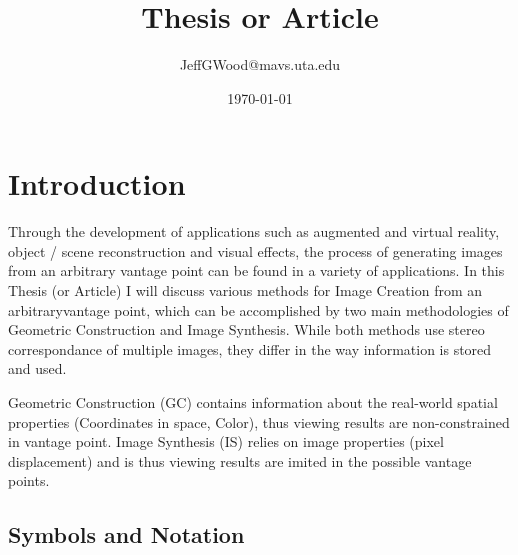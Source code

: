 \documentclass{report}
\title{Thesis or Article}
\author{JeffGWood@mavs.uta.edu}
\date{\today}
\begin{document}
\Huge
\maketitle
\large
\newpage
\tableofcontents
\newpage


\chapter{Introduction}
\par Through the development of applications such as augmented and virtual reality, object / scene reconstruction and visual effects, the process of generating images from an arbitrary vantage point can be found in a variety of applications. In this Thesis (or Article) I will discuss various methods for Image Creation from an arbitraryvantage point, which can be accomplished by two main methodologies of Geometric Construction and Image Synthesis. While both methods use stereo correspondance of multiple images, they differ in the way information is stored and used.
\par Geometric Construction (GC) contains information about the real-world spatial properties (Coordinates in space, Color), thus viewing results are non-constrained in vantage point. Image Synthesis (IS) relies on image properties (pixel displacement) and is thus viewing results are imited in the possible vantage points.
\newpage

\section*{Symbols and Notation}
\end{document}
